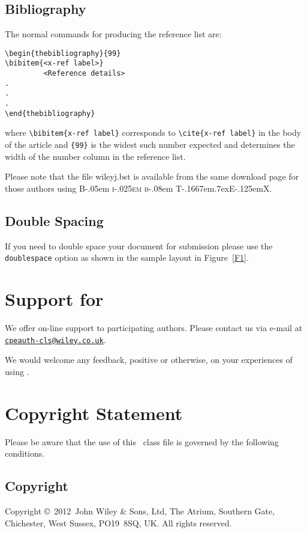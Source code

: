 \documentclass[times]{cpeauth}
\newcommand\BibTeX{{\rmfamily B\kern-.05em \textsc{i\kern-.025em b}\kern-.08em
T\kern-.1667em\lower.7ex\hbox{E}\kern-.125emX}}
\def\volumeyear{2012}
\begin{document}
\subsection{Bibliography}
The normal commands for producing the reference list are:
\begin{verbatim}
\begin{thebibliography}{99}
\bibitem{<x-ref label>}
         <Reference details>
.
.
.
\end{thebibliography}
\end{verbatim}
where \verb"\bibitem{x-ref label}"
corresponds to \verb"\cite{x-ref label}" in the body of the article
and \verb"{99}" is the widest such number expected and determines
the width of the number column in the reference list.

Please note that the file \textsf{wileyj.bst} is available from
the same download page for those authors using \BibTeX.

\subsection{Double Spacing}
If you need to double space your document for submission please
use the \verb+doublespace+ option as shown in the sample layout in
Figure~\ref{F1}.

\section{Support for \textsf{\journalclass}}
We offer on-line support to participating authors. Please contact
us via e-mail at\\
\href{mailto:cpeauth-cls@wiley.co.uk}{\texttt{cpeauth-cls@wiley.co.uk}}.

We would welcome any feedback, positive or otherwise, on your
experiences of using \textsf{\journalclass}.

\section{Copyright Statement}
Please  be  aware that the use of  this \LaTeXe\ class file is
governed by the following conditions.

\subsection{Copyright}
Copyright \copyright\ \volumeyear\ John Wiley \& Sons, Ltd, The
Atrium, Southern Gate, Chichester, West Sussex, PO19~8SQ, UK. All
rights reserved.
\end{document}
